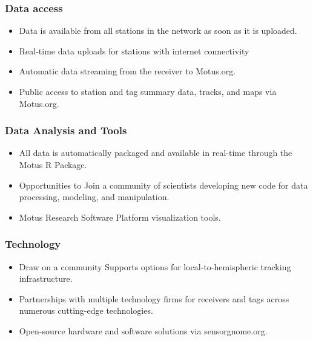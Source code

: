 \documentclass[
]{article}
\providecommand{\tightlist}{%
  \setlength{\itemsep}{0pt}\setlength{\parskip}{0pt}}
\begin{document}
\hypertarget{data-access}{%
\subsubsection{Data access}\label{data-access}}

\begin{itemize}
\tightlist
\item
  Data is available from all stations in the network as soon as it is
  uploaded.
\item
  Real-time data uploads for stations with internet connectivity
\item
  Automatic data streaming from the receiver to Motus.org.
\item
  Public access to station and tag summary data, tracks, and maps via
  Motus.org.
\end{itemize}

\hypertarget{data-analysis-and-tools}{%
\subsubsection{Data Analysis and Tools}\label{data-analysis-and-tools}}

\begin{itemize}
\tightlist
\item
  All data is automatically packaged and available in real-time through
  the Motus R Package.
\item
  Opportunities to Join a community of scientists developing new code
  for data processing, modeling, and manipulation.
\item
  Motus Research Software Platform visualization tools.
\end{itemize}

\hypertarget{technology}{%
\subsubsection{Technology}\label{technology}}

\begin{itemize}
\tightlist
\item
  Draw on a community Supports options for local-to-hemispheric tracking
  infrastructure.
\item
  Partnerships with multiple technology firms for receivers and tags
  across numerous cutting-edge technologies.
\item
  Open-source hardware and software solutions via sensorgnome.org.
\end{itemize}
\end{document}
